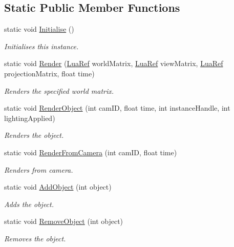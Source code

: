 \subsection*{Static Public Member Functions}
\begin{DoxyCompactItemize}
\item 
static void \hyperlink{class_render_manager_a_p_i_ad70e7b0cd50fae911c5cebe74fb8e88d}{Initialise} ()
\begin{DoxyCompactList}\small\item\em Initialises this instance. \end{DoxyCompactList}\item 
static void \hyperlink{class_render_manager_a_p_i_aac89d4823ec5e7ad3afdb2304874126b}{Render} (\hyperlink{_lua_context_8h_a2220f03700ba40e366f0ee2d684d5c91}{Lua\+Ref} world\+Matrix, \hyperlink{_lua_context_8h_a2220f03700ba40e366f0ee2d684d5c91}{Lua\+Ref} view\+Matrix, \hyperlink{_lua_context_8h_a2220f03700ba40e366f0ee2d684d5c91}{Lua\+Ref} projection\+Matrix, float time)
\begin{DoxyCompactList}\small\item\em Renders the specified world matrix. \end{DoxyCompactList}\item 
static void \hyperlink{class_render_manager_a_p_i_a3d10854e7ddcbb9b77ef23cad6267b67}{Render\+Object} (int cam\+ID, float time, int instance\+Handle, int lighting\+Applied)
\begin{DoxyCompactList}\small\item\em Renders the object. \end{DoxyCompactList}\item 
static void \hyperlink{class_render_manager_a_p_i_aa7db1e8156b186062c635debf2d8776d}{Render\+From\+Camera} (int cam\+ID, float time)
\begin{DoxyCompactList}\small\item\em Renders from camera. \end{DoxyCompactList}\item 
static void \hyperlink{class_render_manager_a_p_i_a3726c6ff353049752b81d55b30f87d69}{Add\+Object} (int object)
\begin{DoxyCompactList}\small\item\em Adds the object. \end{DoxyCompactList}\item 
static void \hyperlink{class_render_manager_a_p_i_a896b447ee292d973bafc4354a14a1cdd}{Remove\+Object} (int object)
\begin{DoxyCompactList}\small\item\em Removes the object. \end{DoxyCompactList}\item 

\end{DoxyCompactItemize}

